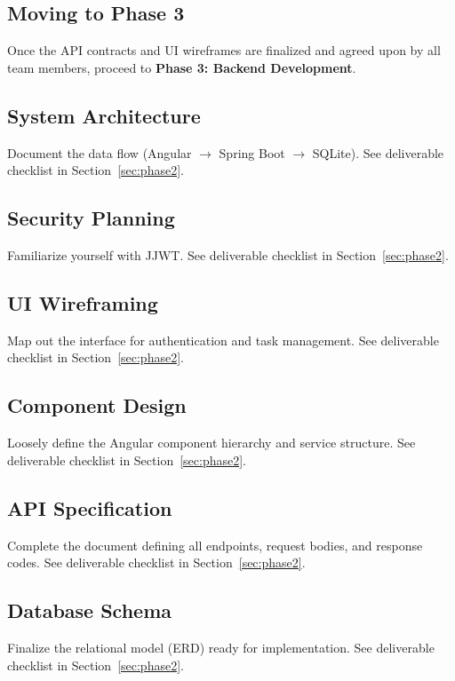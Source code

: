 \subsection{Moving to Phase 3}
Once the API contracts and UI wireframes are finalized and agreed upon by all team members,
proceed to \textbf{Phase 3: Backend Development}.

\newpage
\subsection{System Architecture}\label{sec:architecture}
Document the data flow (Angular $\rightarrow$ Spring Boot $\rightarrow$ SQLite).
See deliverable checklist in Section~\ref{sec:phase2}.

\newpage
\subsection{Security Planning}\label{sec:security-planning}
Familiarize yourself with JJWT.
See deliverable checklist in Section~\ref{sec:phase2}.

\newpage
\subsection{UI Wireframing}\label{sec:wireframing}
Map out the interface for authentication and task management.
See deliverable checklist in Section~\ref{sec:phase2}.

\newpage
\subsection{Component Design}\label{sec:component-design}
Loosely define the Angular component hierarchy and service structure.
See deliverable checklist in Section~\ref{sec:phase2}.

\newpage
\subsection{API Specification}\label{sec:api-spec}
Complete the document defining all endpoints, request bodies, and response codes.
See deliverable checklist in Section~\ref{sec:phase2}.

\newpage
\subsection{Database Schema}\label{sec:database-schema}
Finalize the relational model (ERD) ready for implementation.
See deliverable checklist in Section~\ref{sec:phase2}.

\newpage
